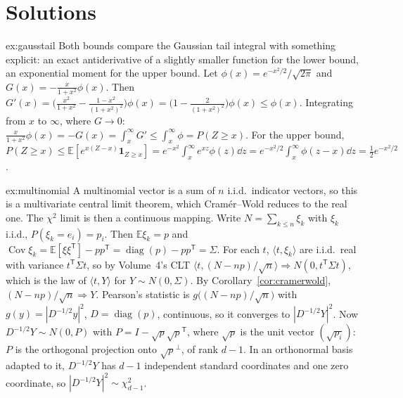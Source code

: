 \section{Solutions}

\begin{solution}{ex:gausstail}
\idea Both bounds compare the Gaussian tail integral with something explicit: an exact antiderivative of a slightly smaller function for the lower bound, an exponential
moment for the upper bound.
\writeup Let $\phi(x)=e^{-x^2/2}/\sqrt{2\pi}$ and $G(x)=-\frac x{1+x^2}\phi(x)$. Then $G'(x)=\bigl(\frac{x^2}{1+x^2}-\frac{1-x^2}{(1+x^2)^2}\bigr)\phi(x)=\bigl(1-\frac2{(1+x^2)^2}\bigr)\phi(x)\le\phi(x)$. Integrating
from $x$ to $\infty$, where $G\to0$: $\frac x{1+x^2}\phi(x)=-G(x)=\int_x^\infty G'\le\int_x^\infty\phi=P(Z\ge x)$. For the upper bound, $P(Z\ge x)\le\mathbb E[e^{x(Z-x)}\mathbf 1_{Z\ge x}]=
e^{-x^2}\int_x^\infty e^{xz}\phi(z)\dd z=e^{-x^2/2}\int_x^\infty\phi(z-x)\dd z=\frac12e^{-x^2/2}$.
\end{solution}

\begin{solution}{ex:multinomial}
\idea A multinomial vector is a sum of $n$ i.i.d.\ indicator vectors, so this is a multivariate central limit theorem, which Cram\'er--Wold reduces to the real one. The
$\chi^2$ limit is then a continuous mapping.
\writeup Write $N=\sum_{k\le n}\xi_k$ with $\xi_k$ i.i.d., $P(\xi_k=e_i)=p_i$. Then $\mathbb E\xi_k=p$ and $\operatorname{Cov}\xi_k=\mathbb E[\xi\xi^{\mathsf T}]-pp^{\mathsf T}=\operatorname{diag}(p)-pp^{\mathsf T}=\Sigma$. For each
$t$, $\langle t,\xi_k\rangle$ are i.i.d.\ real with variance $t^{\mathsf T}\Sigma t$, so by Volume~4's CLT $\langle t,(N-np)/\sqrt n\rangle\Rightarrow N(0,t^{\mathsf T}\Sigma t)$, which is the law of
$\langle t,Y\rangle$ for $Y\sim N(0,\Sigma)$. By Corollary~\ref{cor:cramerwold}, $(N-np)/\sqrt n\Rightarrow Y$. Pearson's statistic is $g\bigl((N-np)/\sqrt n\bigr)$ with $g(y)=|D^{-1/2}y|^2$,
$D=\operatorname{diag}(p)$, continuous, so it converges to $|D^{-1/2}Y|^2$. Now $D^{-1/2}Y\sim N(0,P)$ with $P=I-\sqrt p\sqrt p^{\mathsf T}$, where $\sqrt p$ is the unit vector $(\sqrt{p_i})$:
$P$ is the orthogonal projection onto $\sqrt p^\perp$, of rank $d-1$. In an orthonormal basis adapted to it, $D^{-1/2}Y$ has $d-1$ independent standard coordinates and one zero coordinate,
so $|D^{-1/2}Y|^2\sim\chi^2_{d-1}$.
\end{solution}

